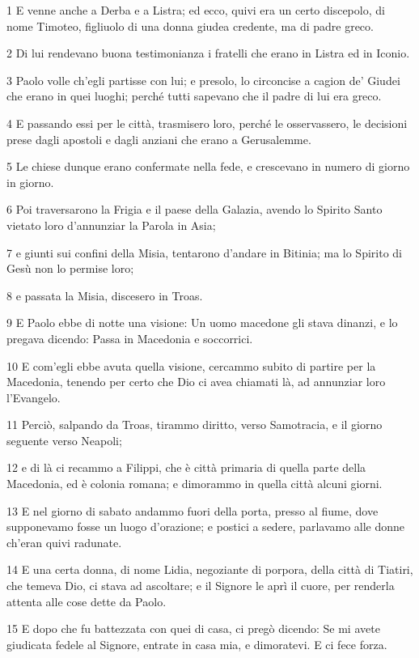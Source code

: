 \par 1 E venne anche a Derba e a Listra; ed ecco, quivi era un certo discepolo, di nome Timoteo, figliuolo di una donna giudea credente, ma di padre greco.
\par 2 Di lui rendevano buona testimonianza i fratelli che erano in Listra ed in Iconio.
\par 3 Paolo volle ch'egli partisse con lui; e presolo, lo circoncise a cagion de' Giudei che erano in quei luoghi; perché tutti sapevano che il padre di lui era greco.
\par 4 E passando essi per le città, trasmisero loro, perché le osservassero, le decisioni prese dagli apostoli e dagli anziani che erano a Gerusalemme.
\par 5 Le chiese dunque erano confermate nella fede, e crescevano in numero di giorno in giorno.
\par 6 Poi traversarono la Frigia e il paese della Galazia, avendo lo Spirito Santo vietato loro d'annunziar la Parola in Asia;
\par 7 e giunti sui confini della Misia, tentarono d'andare in Bitinia; ma lo Spirito di Gesù non lo permise loro;
\par 8 e passata la Misia, discesero in Troas.
\par 9 E Paolo ebbe di notte una visione: Un uomo macedone gli stava dinanzi, e lo pregava dicendo: Passa in Macedonia e soccorrici.
\par 10 E com'egli ebbe avuta quella visione, cercammo subito di partire per la Macedonia, tenendo per certo che Dio ci avea chiamati là, ad annunziar loro l'Evangelo.
\par 11 Perciò, salpando da Troas, tirammo diritto, verso Samotracia, e il giorno seguente verso Neapoli;
\par 12 e di là ci recammo a Filippi, che è città primaria di quella parte della Macedonia, ed è colonia romana; e dimorammo in quella città alcuni giorni.
\par 13 E nel giorno di sabato andammo fuori della porta, presso al fiume, dove supponevamo fosse un luogo d'orazione; e postici a sedere, parlavamo alle donne ch'eran quivi radunate.
\par 14 E una certa donna, di nome Lidia, negoziante di porpora, della città di Tiatiri, che temeva Dio, ci stava ad ascoltare; e il Signore le aprì il cuore, per renderla attenta alle cose dette da Paolo.
\par 15 E dopo che fu battezzata con quei di casa, ci pregò dicendo: Se mi avete giudicata fedele al Signore, entrate in casa mia, e dimoratevi. E ci fece forza.
